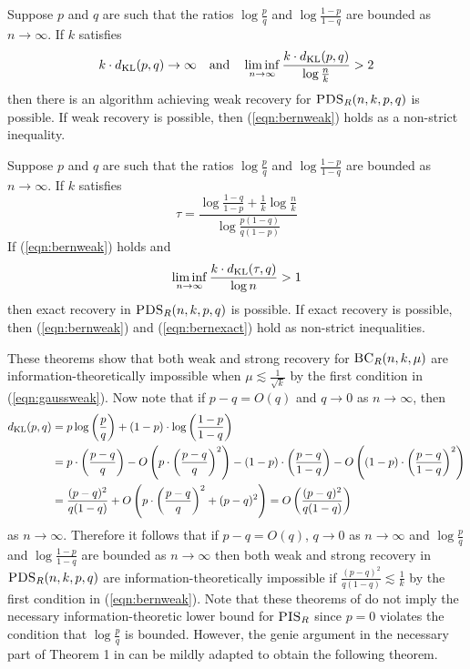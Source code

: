 \begin{theorem}
Suppose $p$ and $q$ are such that the ratios $\log \frac{p}{q}$ and $\log \frac{1 - p}{1 - q}$ are bounded as $n \to \infty$. If $k$ satisfies
\begin{equation} \label{eqn:bernweak}
k \cdot d_{\text{KL}}(p, q) \to \infty \quad \text{and} \quad \liminf_{n \to \infty} \frac{k \cdot d_{\text{KL}}(p, q)}{\log \frac{n}{k}} > 2
\end{equation}
then there is an algorithm achieving weak recovery for $\textsc{PDS}_R(n, k, p, q)$ is possible. If weak recovery is possible, then (\ref{eqn:bernweak}) holds as a non-strict inequality.
\end{theorem}

\begin{theorem} \label{thm:pdsexact}
Suppose $p$ and $q$ are such that the ratios $\log \frac{p}{q}$ and $\log \frac{1 - p}{1 - q}$ are bounded as $n \to \infty$. If $k$ satisfies
$$\tau = \frac{\log \frac{1 - q}{1 - p} + \frac{1}{k} \log \frac{n}{k}}{\log \frac{p(1 - q)}{q(1 - p)}}$$
If (\ref{eqn:bernweak}) holds and
\begin{equation} \label{eqn:bernexact}
\liminf_{n \to \infty} \frac{k \cdot d_{\text{KL}}(\tau, q)}{\log n} > 1
\end{equation}
then exact recovery in $\textsc{PDS}_R(n, k, p, q)$ is possible. If exact recovery is possible, then (\ref{eqn:bernweak}) and (\ref{eqn:bernexact}) hold as non-strict inequalities.
\end{theorem}

These theorems show that both weak and strong recovery for $\textsc{BC}_R(n, k, \mu)$ are information-theoretically impossible when $\mu \lesssim \frac{1}{\sqrt{k}}$ by the first condition in (\ref{eqn:gaussweak}). Now note that if $p - q = O(q)$ and $q \to 0$ as $n \to \infty$, then
\begin{align*}
d_{\text{KL}}(p, q) &= p \log \left( \frac{p}{q} \right) + (1 - p) \cdot \log \left( \frac{1 - p}{1 - q} \right) \\
&= p \cdot \left( \frac{p - q}{q} \right) - O\left( p \cdot \left( \frac{p - q}{q} \right)^2 \right) - (1 - p) \cdot \left( \frac{p - q}{1 - q} \right) - O\left( (1 - p) \cdot \left( \frac{p - q}{1 - q} \right)^2 \right) \\
&= \frac{(p - q)^2}{q(1 - q)} + O\left( p \cdot \left( \frac{p - q}{q} \right)^2 + (p - q)^2 \right) = O\left( \frac{(p - q)^2}{q(1 - q)} \right)
\end{align*}
as $n \to \infty$. Therefore it follows that if $p - q = O(q)$, $q \to 0$ as $n \to \infty$ and $\log \frac{p}{q}$ and $\log \frac{1 - p}{1 - q}$ are bounded as $n \to \infty$ then both weak and strong recovery in $\textsc{PDS}_R(n, k, p, q)$ are information-theoretically impossible if $\frac{(p - q)^2}{q(1 - q)} \lesssim \frac{1}{k}$ by the first condition in (\ref{eqn:bernweak}). Note that these theorems of \cite{hajek2016information} do not imply the necessary information-theoretic lower bound for $\textsc{PIS}_R$ since $p = 0$ violates the condition that $\log \frac{p}{q}$ is bounded. However, the genie argument in the necessary part of Theorem 1 in \cite{hajek2016information} can be mildly adapted to obtain the following theorem.

